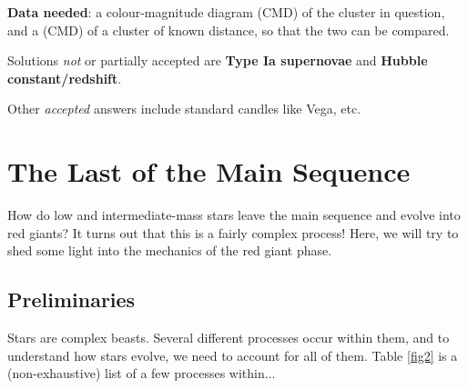 \documentclass[a4paper,11pt]{exam}
\begin{document}
\begin{questions}
\begin{solution}
\begin{enumerate}[leftmargin=12pt]
			\textbf{Data needed}: a colour-magnitude diagram (CMD) of the cluster in question, and a (CMD) of a cluster of known distance, so that the two can be compared.
		\end{enumerate}
		Solutions \textit{not} or partially accepted are \textbf{Type Ia supernovae} and \textbf{Hubble constant/redshift}.
		
		Other \textit{accepted} answers include standard candles like Vega, etc.
	\end{solution}
\end{questions}

\newpage
\section{The Last of the Main Sequence}
How do low and intermediate-mass stars leave the main sequence and evolve into red giants? It turns out that this is a fairly complex process! Here, we will try to shed some light into the mechanics of the red giant phase. 

\subsection*{Preliminaries}
Stars are complex beasts. Several different processes occur within them, and to understand how stars evolve, we need to account for all of them. Table \ref{fig2} is a (non-exhaustive) list of a few processes within...
\end{document}
